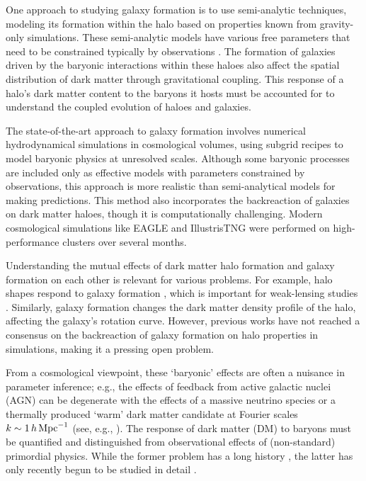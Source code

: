 \documentclass[a4paper, 12pt, oneside]{Thesis}  %
\begin{document}
One approach to studying galaxy formation is to use semi-analytic techniques, modeling its formation within the halo based on properties known from gravity-only simulations. These semi-analytic models have various free parameters that need to be constrained typically by observations \citep{2015ARA&A..53...51S}. The formation of galaxies driven by the baryonic interactions within these haloes also affect the spatial distribution of dark matter through gravitational coupling. This response of a halo's dark matter content to the baryons it hosts must be accounted for to understand the coupled evolution of haloes and galaxies.

The state-of-the-art approach to galaxy formation involves numerical hydrodynamical simulations in cosmological volumes, using subgrid recipes to model baryonic physics at unresolved scales. Although some baryonic processes are included only as effective models with parameters constrained by observations, this approach is more realistic than semi-analytical models for making predictions. This method also incorporates the backreaction of galaxies on dark matter haloes, though it is computationally challenging. Modern cosmological simulations like EAGLE \citep{2015Schaye_EAGLE} and IllustrisTNG \citep{2018MNRAS.480.5113M} were performed on high-performance clusters over several months.

Understanding the mutual effects of dark matter halo formation and galaxy formation on each other is relevant for various problems. For example, halo shapes respond to galaxy formation \citep{2010MNRAS.407..435A,2021MNRAS.501.5679C}, which is important for weak-lensing studies \citep{2021A&A...647A.185G}. Similarly, galaxy formation changes the dark matter density profile of the halo, affecting the galaxy's rotation curve. However, previous works have not reached a consensus on the backreaction of galaxy formation on halo properties in simulations, making it a pressing open problem.

From a cosmological viewpoint, these `baryonic' effects are often a nuisance in parameter inference; e.g., the effects of feedback from active galactic nuclei (AGN) can be degenerate with the effects of a massive neutrino species or a thermally produced ‘warm’ dark matter candidate at Fourier scales $k\sim1\,h\,{\rm Mpc}^{-1}$ (see, e.g., \cite{2019Chisari_etal_Baryfeedback,2020AricoAnguloetal_baryonifi}). The response of dark matter (DM) to baryons must be quantified and distinguished from observational effects of (non-standard) primordial physics. While the former problem has a long history \cite{1986Blumenthal,2004Gnesin_etal,2005SellwoodMcGaugh,2006Gustafsson_FS,2010Abadi_NFBS,2010DuffySchaye_etal,2010PedrosaTissera_etal,2010TisseraWhite_etal,2019ArtalePedrosa_etal,2022ForouharMoreno_etal,2023Velmani&Paranjape}, the latter has only recently begun to be studied in detail \cite{2011TeyssierMMDM,2015SchneiderTeyssier,2015Mead_PHJH,2020AricoAnguloetal_baryonifi,2021AricoAnguloetal_baryonifi,2023EuclidCastro_etal}.
\end{document}
